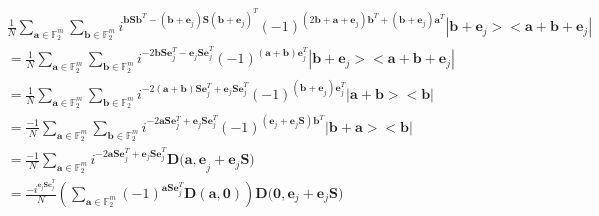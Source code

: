 \documentclass{article}
\begin{document}
\begin{enumerate}
	\begin{align}
		&\frac{1}{N}\sum_{\mathbf{a} \in \mathbb{F}^m_2}{\sum_{\mathbf{b} \in \mathbb{F}^m_2}{i^{\mathbf{b S b}^T -(\mathbf{b+e}_j)\mathbf{S}(\mathbf{b+e}_j)^T} (-1)^{(2\mathbf{b}+\mathbf{a+e}_j)\mathbf{b}^T+(\mathbf{b+e}_j)\mathbf{a}^T} |\mathbf{b+e}_j> <\mathbf{a+b+e}_j |    } }\nonumber \\
		&=\frac{1}{N}\sum_{\mathbf{a} \in \mathbb{F}^m_2}{\sum_{\mathbf{b} \in \mathbb{F}^m_2}{i^{-2\mathbf{b S }\mathbf{e}_j^T-\mathbf{e}_j \mathbf{S e}_j^T} (-1)^{(\mathbf{a+b})\mathbf{e}_j^T} |\mathbf{b+e}_j> <\mathbf{a+b+e}_j |    } }\nonumber\\
		&=\frac{1}{N}\sum_{\mathbf{a} \in \mathbb{F}^m_2}{\sum_{\mathbf{b} \in \mathbb{F}^m_2}{i^{-2\mathbf{(a+b) S }\mathbf{e}_j^T+\mathbf{e}_j \mathbf{S e}_j^T} (-1)^{(\mathbf{b+e}_j)\mathbf{e}_j^T} |\mathbf{a+b}> <\mathbf{b} |    } }\nonumber \\
		&=\frac{-1}{N}\sum_{\mathbf{a} \in \mathbb{F}^m_2}{\sum_{\mathbf{b} \in \mathbb{F}^m_2}{i^{-2\mathbf{a S }\mathbf{e}_j^T+\mathbf{e}_j \mathbf{S e}_j^T} (-1)^{(\mathbf{e}_j+\mathbf{e}_j\mathbf{S})\mathbf{b}^T} |\mathbf{b+a}> <\mathbf{b} |    } } \nonumber \\
		&=\frac{-1}{N}\sum_{\mathbf{a} \in \mathbb{F}^m_2}{i^{-2\mathbf{a S }\mathbf{e}_j^T+\mathbf{e}_j \mathbf{S e}_j^T} \mathbf{D(a,e}_j+\mathbf{e}_j\mathbf{S})} \nonumber\\
		&=\frac{-i^{\mathbf{e}_j \mathbf{S e}_j^T}}{N} \left(\sum_{\mathbf{a} \in \mathbb{F}^m_2}{(-1)^{\mathbf{a S }\mathbf{e}_j^T} \mathbf{D(a,0)}} \right) \mathbf{D(0},\mathbf{e}_j+\mathbf{e}_j \mathbf{S}) \label{FinalRes}
	\end{align}
	\\
	

\end{enumerate}
\end{document}
